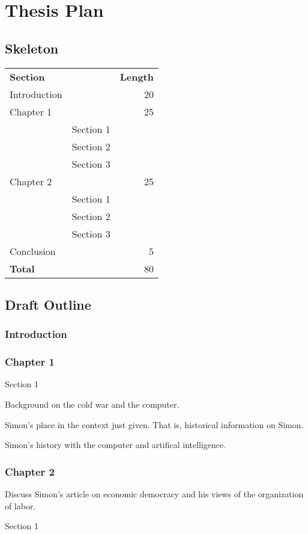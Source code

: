 \documentclass[paper=A4,portrait,twoside=true,twocolumn=true,headinclude=false,footinclude=false,fontsize=10,BCOR=15mm,DIV=13,pagesize=auto,titlepage=firstiscover,mpinclude=true,open=right,chapterprefix=true,numbers=autoendperiod,headsepline=false,parskip=false]{scrbook}
\theoremstyle{definition}
\begin{document}
\chapter{Thesis Plan}
\label{sec:org7b548e9}
\section{Skeleton}
\label{sec:orgd2bfb93}
\begin{center}
\begin{tabular}{llr}
\textbf{Section} &  & \textbf{Length}\\
Introduction &  & 20\\
Chapter 1 &  & 25\\
 & Section 1 & \\
 & Section 2 & \\
 & Section 3 & \\
Chapter 2 &  & 25\\
 & Section 1 & \\
 & Section 2 & \\
 & Section 3 & \\
Conclusion &  & 5\\
\textbf{Total} &  & 80\\
\end{tabular}
\end{center}
\section{Draft Outline}
\label{sec:org3ed55ba}
\subsection{Introduction}
\label{sec:org98283b6}
\subsection{Chapter 1}
\label{sec:orgd91d449}
\begin{labeling}[~]{Section 1} 
\item[Section 1] Background on the cold war and the computer. 
\item[Section 2] Simon's place in the context just given. That is, historical information on Simon.
\item[Section 3] Simon's history with the computer and artifical intelligence.
\end{labeling}
\subsection{Chapter 2}
\label{sec:org2d7659e}
Discuss Simon's article on economic democracy and his views of the
organization of labor. 
\begin{labeling}[~]{Section 1} 
\item[Section 1] 
\item[Section 2] 
\item[Section 3] 
\end{labeling}
\end{document}
